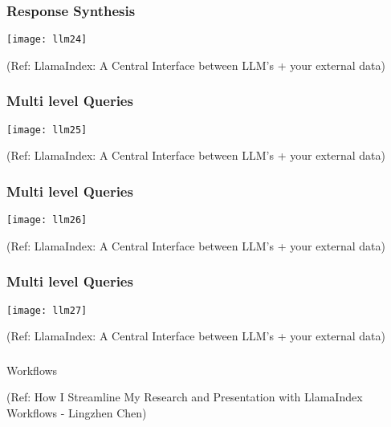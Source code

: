 \begin{frame}[fragile]\frametitle{Response Synthesis}

\begin{center}
\texttt{[image: llm24]}

{\tiny (Ref: LlamaIndex: A Central Interface between LLM's + your external data)}
\end{center}
\end{frame}

\begin{frame}[fragile]\frametitle{Multi level Queries}

\begin{center}
\texttt{[image: llm25]}

{\tiny (Ref: LlamaIndex: A Central Interface between LLM's + your external data)}
\end{center}
\end{frame}

\begin{frame}[fragile]\frametitle{Multi level Queries}

\begin{center}
\texttt{[image: llm26]}

{\tiny (Ref: LlamaIndex: A Central Interface between LLM's + your external data)}
\end{center}
\end{frame}

\begin{frame}[fragile]\frametitle{Multi level Queries}

\begin{center}
\texttt{[image: llm27]}

{\tiny (Ref: LlamaIndex: A Central Interface between LLM's + your external data)}
\end{center}
\end{frame}



\begin{frame}[fragile]\frametitle{}
\begin{center}
{\Large Workflows}

{\tiny (Ref: How I Streamline My Research and Presentation with LlamaIndex Workflows - Lingzhen Chen)}
\end{center}
\end{frame}


